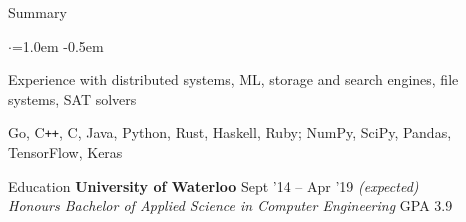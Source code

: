 \documentclass{resume} %
\begin{document}

\begin{rSection}{Summary}
  \vspace{0.5em}
  \begin{list}{$\cdot$}{\leftmargin=1.0em}
    \itemsep -0.5em \vspace{-0.5em}
    \item Experience with distributed systems, ML, storage and search engines,
      file systems, SAT solvers
    \item Go, C\texttt{++}, C, Java, Python, Rust, Haskell, Ruby; NumPy, SciPy,
      Pandas, TensorFlow, Keras
  \end{list}
  \vspace{0.5em}
\end{rSection}


\begin{rSection}{Education}
  {\bf University of Waterloo} \hfill {Sept '14 -- Apr '19 \em (expected)} \\
  {\em Honours Bachelor of Applied Science in Computer Engineering} \hfill {GPA 3.9}
  \vspace{0.5em}
\end{rSection}

\end{document}
